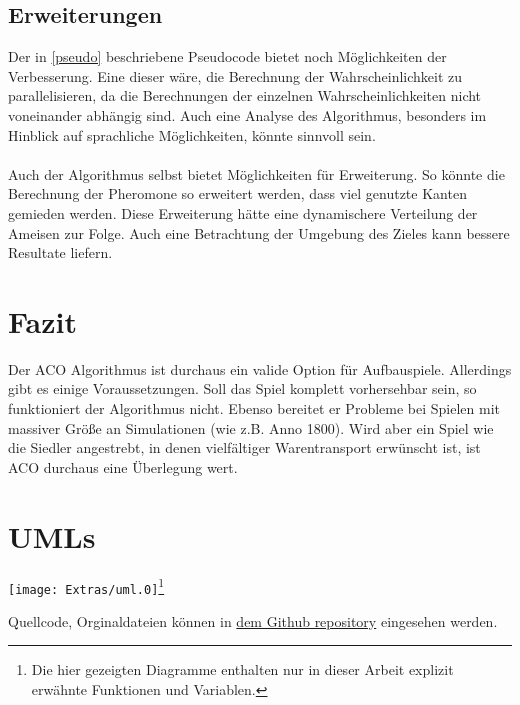 \documentclass[12pt]{article}
\begin{document}
\subsection{Erweiterungen}
Der in \ref{pseudo} beschriebene Pseudocode bietet noch Möglichkeiten der Verbesserung.
Eine dieser wäre, die Berechnung der Wahrscheinlichkeit zu parallelisieren, da die Berechnungen der einzelnen Wahrscheinlichkeiten nicht voneinander abhängig sind. Auch eine Analyse des Algorithmus, besonders im Hinblick auf sprachliche Möglichkeiten, könnte sinnvoll sein.\\\\
Auch der Algorithmus selbst bietet Möglichkeiten für Erweiterung. So könnte die Berechnung der Pheromone so erweitert werden, dass viel genutzte Kanten gemieden werden. Diese Erweiterung hätte eine dynamischere Verteilung der Ameisen zur Folge. Auch eine Betrachtung der Umgebung des Zieles kann bessere Resultate liefern.
\section{Fazit}
Der ACO Algorithmus ist durchaus ein valide Option für Aufbauspiele. Allerdings gibt es einige Voraussetzungen. Soll das Spiel komplett vorhersehbar sein, so funktioniert der Algorithmus nicht. Ebenso bereitet er Probleme bei Spielen mit massiver Größe an Simulationen (wie z.B. Anno 1800).
Wird aber ein Spiel wie die Siedler angestrebt, in denen vielfältiger Warentransport erwünscht ist, ist ACO durchaus eine Überlegung wert.


\section{UMLs}
\begin{center}
\texttt{[image: Extras/uml.0]}\footnote{Die hier gezeigten Diagramme enthalten nur in dieser Arbeit explizit erwähnte Funktionen und Variablen.}
\end{center}
\nocite{*}
\printbibliography[heading=bibnumbered]
Quellcode, Orginaldateien können in \href{https://github.com/Kauruck/Facharbeit_AOC}{dem Github repository} eingesehen werden.
\end{document}
